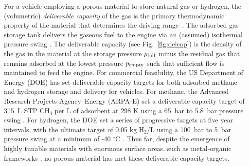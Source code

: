 

For a vehicle employing a porous material to store natural gas or hydrogen, the (volumetric) \emph{deliverable capacity} of the gas is the primary thermodynamic property of the material that determines the driving range~\cite{mason2014evaluating}. The adsorbed gas storage tank delivers the gaseous fuel to the engine via an (assumed) isothermal pressure swing \cite{sircar2002pressure}. The deliverable capacity (see Fig.~\ref{fig:delcap}) is the density of the gas in the material at the storage pressure $p_{\text{full}}$ minus the residual gas that remains adsorbed at the lowest pressure $p_{\text{empty}}$ such that sufficient flow is maintained to feed the engine.
For commercial feasibility, the US Department of Energy (DOE) has set deliverable capacity targets for both adsorbed methane and hydrogen storage and delivery for vehicles. For methane, the Advanced Research Projects Agency--Energy (ARPA-E) set a deliverable capacity target of 315\ L STP CH$_4$ per L of adsorbent at 298 K using a 65\ bar to 5.8\ bar pressure swing \cite{simon2015materials}. For hydrogen, the DOE set a series of progressive targets at five year intervals, with the ultimate target of 0.05 kg H$_2$/L \cite{h2targetsDOE} using a 100\ bar to 5\ bar pressure swing at a minimum of -40 $^\circ$C \cite{allendorf2018assessment}. Thus far, despite the emergence of highly tunable materials with enormous surface areas, such as metal-organic frameworks \cite{furukawa2013chemistry}, no porous material has met these deliverable capacity targets. 

